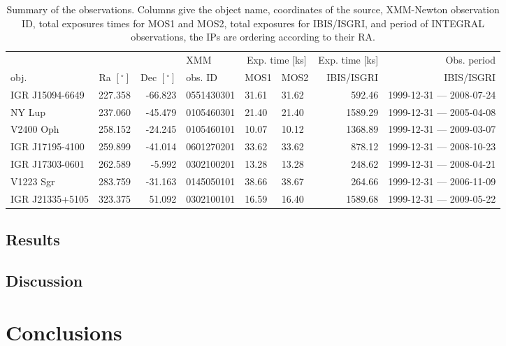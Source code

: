 \documentclass[oneside,a4paper,11pt]{report}
\begin{document}
\begin{table}
\begin{center}
\caption{Summary of the observations. Columns give the object name, coordinates of the source, XMM-Newton 
observation ID, total exposures times for MOS1 and MOS2, total exposures for IBIS/ISGRI, and period of INTEGRAL observations, 
the IPs are ordering according to their RA.}
\begin{tabular}{lrrlllrr}
\hline
\hline
     &     &     &XMM &\multicolumn{2}{c}{Exp. time [ks]}&Exp. time [ks]& Obs. period  \\
obj. & Ra $\mathrm{[^{\circ}]}$ & Dec $\mathrm{[^{\circ}]}$&obs. ID  & MOS1&MOS2& IBIS/ISGRI & IBIS/ISGRI \\ 
\hline
IGR J15094-6649&  227.358  & -66.823 & 0551430301&31.61     & 31.62& 592.46      &   1999-12-31 --- 2008-07-24                 \\
NY Lup         &  237.060  & -45.479 & 0105460301&21.40     & 21.40& 1589.29     &    1999-12-31 --- 2005-04-08                \\
V2400 Oph      &  258.152  & -24.245 & 0105460101&10.07     &10.12& 1368.89     &     1999-12-31 --- 2009-03-07                \\
IGR J17195-4100&  259.899  & -41.014 & 0601270201&33.62     &33.62&  878.12    &     1999-12-31 --- 2008-10-23              \\
IGR J17303-0601&  262.589  &  -5.992 & 0302100201&13.28     &13.28&   248.62   &       1999-12-31 --- 2008-04-21              \\
V1223 Sgr      &  283.759  & -31.163 & 0145050101&38.66     &38.67&   264.66  &     1999-12-31 --- 2006-11-09               \\
IGR J21335+5105&  323.375  &  51.092 & 0302100101&16.59     &16.40 & 1589.68    & 1999-12-31 --- 2009-05-22                   \\
\hline
\end{tabular}
\end{center}
\end{table}




\section{Results}
\section{Discussion}
\chapter{Conclusions}
\end{document}
